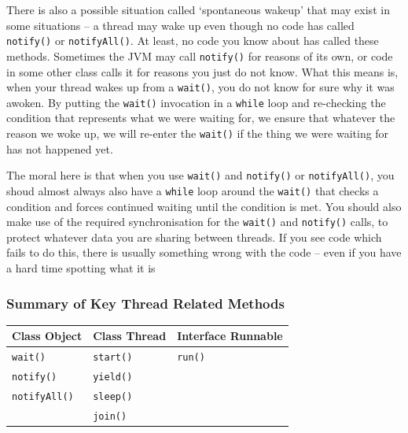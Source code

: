 There is also a possible situation called `spontaneous wakeup' that may exist 
in some situations -- a thread may wake up even though no code has called 
\verb#notify()# or \verb#notifyAll()#. At least, no code you know about has 
called these methods. Sometimes the JVM may call \verb#notify()# for reasons of 
its own, or code in some other class calls it for reasons you just do not know.
What this means is, when your thread wakes up from a \verb#wait()#, you do not 
know for sure why it was awoken. By putting the \verb#wait()# invocation in a 
\verb#while# loop and re-checking the condition that represents what we were 
waiting for, we ensure that whatever the reason we woke up, we will re-enter 
the \verb#wait()# if the thing we were waiting for has not happened yet. 

The moral here is that when you use \verb#wait()# and \verb#notify()# or 
\verb#notifyAll()#, you shoud almost always also have a \verb#while# loop 
around the \verb#wait()# that checks a condition and forces continued waiting 
until the condition is met. You should also make use of the required 
synchronisation for the \verb#wait()# and \verb#notify()# calls, to protect 
whatever data you are sharing between threads. If you see code which fails to 
do this, there is usually something wrong with the code -- even if you have a 
hard time spotting what it is

\subsubsection{Summary of Key Thread Related Methods}
\begin{center}
\begin{tabular}{lll}
    \textbf{Class Object} & \textbf{Class Thread} & \textbf{Interface Runnable} 
    \\
    \hline
    \verb#wait()# & \verb#start()# & \verb#run()# \\
    \verb#notify()# & \verb#yield()# & \\
    \verb#notifyAll()# & \verb#sleep()# & \\
    & \verb#join()# & \\
\end{tabular}
\end{center}
